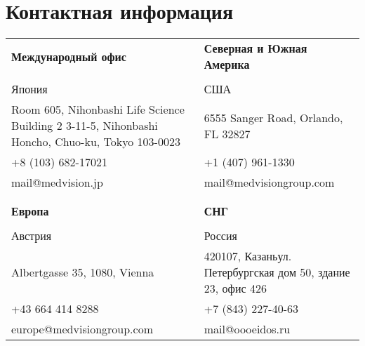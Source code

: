 \ifIsLngRus  %
{
    \section{Контактная информация}
    \begin{longtable}{p{5cm} p{5cm}}
    \textbf{Международный офис} & \textbf{Северная и Южная Америка}\\
    \\
    Япония & США\\
    Room 605, Nihonbashi Life Science Building 2 3-11-5, Nihonbashi Honcho, Chuo-ku, Tokyo 103-0023 & 6555 Sanger Road, Orlando, FL 32827 \\
    +8 (103) 682-17021 &  +1 (407) 961-1330 \\
    mail@medvision.jp & mail@medvisiongroup.com\\
    \\
    \\
    \textbf{Европа} & \textbf{СНГ}\\
    \\
    Австрия & Россия\\
    Albertgasse 35, 1080, Vienna & 420107, Казань\newline ул. Петербургская дом 50, здание 23, офис 426\\
    +43 664 414 8288 &  +7 (843) 227-40-63\\
    europe@medvisiongroup.com & mail@oooeidos.ru\\
    \end{longtable}
    \newpage
}
\fi
\ifIsLngEng  %
